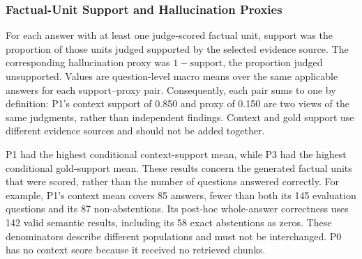 \subsubsection{Factual-Unit Support and Hallucination Proxies}
\begin{table}[H]
\centering
\caption{Model-judged support for generated factual units and complementary
hallucination proxies. Context refers to the final retrieved chunks; gold
refers to annotated FinanceBench evidence. Parentheses give the number of
scored answers. Unsupported units are not independently verified false claims.}
\label{tab:main-support-results}
\end{table}
For each answer with at least one judge-scored factual unit, support was the
proportion of those units judged supported by the selected evidence source.
The corresponding hallucination proxy was $1-\text{support}$, the proportion
judged unsupported. Values are question-level macro means over the same
applicable answers for each support--proxy pair. Consequently, each pair sums
to one by definition: P1's context support of 0.850 and proxy of 0.150 are two
views of the same judgments, rather than independent findings. Context and
gold support use different evidence sources and should not be added together.

P1 had the highest conditional context-support mean, while P3 had the highest
conditional gold-support mean. These results concern the generated factual
units that were scored, rather than the number of questions answered
correctly. For example, P1's context mean covers 85 answers, fewer than both
its 145 evaluation questions and its 87 non-abstentions. Its post-hoc
whole-answer correctness uses 142 valid semantic results, including its 58
exact abstentions as zeros. These denominators describe different populations
and must not be interchanged. P0 has no context score because it received no
retrieved chunks.

